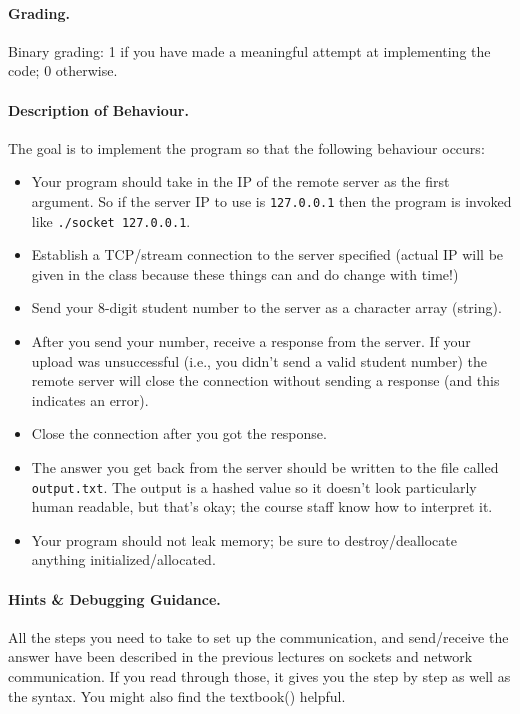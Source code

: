\paragraph{Grading.} Binary grading: 1 if you have made a meaningful attempt at implementing the code; 0 otherwise.

\paragraph{Description of Behaviour.} The goal is to implement the program so that the following behaviour occurs:

\begin{itemize}
	\item Your program should take in the IP of the remote server as the first argument. So if the server IP to use is \texttt{127.0.0.1} then the program is invoked like \texttt{./socket 127.0.0.1}.
	\item Establish a TCP/stream connection to the server specified (actual IP will be given in the class because these things can and do change with time!) 
	\item Send your 8-digit student number to the server as a character array (string).
	\item After you send your number, receive a response from the server. If your upload was unsuccessful (i.e., you didn't send a valid student number) the remote server will close the connection without sending a response (and this indicates an error).
	\item Close the connection after you got the response.
	\item The answer you get back from the server should be written to the file called \texttt{output.txt}. The output is a hashed value so it doesn't look particularly human readable, but that's okay; the course staff know how to interpret it.
	\item Your program should not leak memory; be sure to destroy/deallocate anything initialized/allocated.
\end{itemize}


\paragraph{Hints \& Debugging Guidance.}
All the steps you need to take to set up the communication, and send/receive the answer have been described in the previous lectures on sockets and network communication. If you read through those, it gives you the step by step as well as the syntax. You might also find the textbook(\cite{apunix}) helpful.

